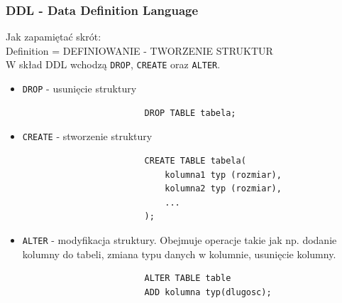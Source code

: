 \documentclass[a4paper,12pt,oneside]{book}
\begin{document}
				\subsubsection{DDL - Data Definition Language}
				\noindent Jak zapamiętać skrót: \\ Definition = DEFINIOWANIE - TWORZENIE STRUKTUR \\
				\noindent W skład DDL wchodzą \verb*|DROP|, \verb*|CREATE| oraz \verb*|ALTER|.
				\begin{itemize}
					\itemsep 0em
					\item \verb*|DROP| - usunięcie struktury
					\begin{verbatim}
						DROP TABLE tabela;
					\end{verbatim}
					\item \verb*|CREATE| - stworzenie struktury
					\begin{verbatim}
						CREATE TABLE tabela(
							kolumna1 typ (rozmiar),
							kolumna2 typ (rozmiar),
							...
						);
					\end{verbatim}
					\item \verb*|ALTER| - modyfikacja struktury. Obejmuje operacje takie jak np. dodanie kolumny do tabeli, zmiana typu danych w kolumnie, usunięcie kolumny.
					\begin{verbatim}
						ALTER TABLE table
						ADD kolumna typ(dlugosc);
					\end{verbatim}
					\begin{verbatim}
						
					\end{verbatim}
				\end{itemize}
				
				
\end{document}
